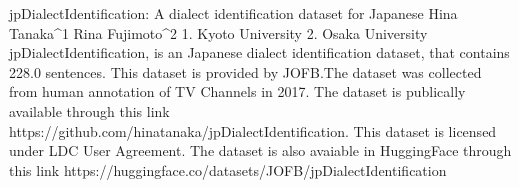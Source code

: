 
jpDialectIdentification: A dialect identification dataset for Japanese
Hina Tanaka^1 Rina Fujimoto^2
1. Kyoto University 2. Osaka University
jpDialectIdentification, is an Japanese dialect identification dataset, that contains 228.0 sentences.
This dataset is provided by JOFB.The dataset was collected from human annotation of TV Channels in 2017. 
The dataset is publically available through this link https://github.com/hinatanaka/jpDialectIdentification. This dataset is licensed under LDC User Agreement.
The dataset is also avaiable in HuggingFace through this link https://huggingface.co/datasets/JOFB/jpDialectIdentification
